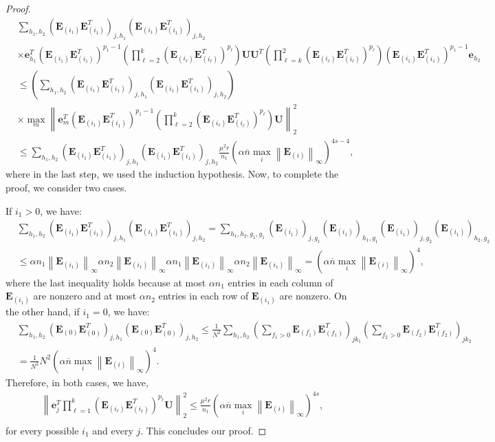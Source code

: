 \documentclass[twoside,11pt]{article}
\newcommand{\norm}[1]{\left\lVert#1\right\rVert}
\newcommand{\matE}{\mathbf{E}}
\newcommand{\matU}{\mathbf{U}}
\newcommand{\vece}{\mathbf{e}}
\newcommand{\bn}{{\overline{n}}}
\newcommand{\abnb}{\alpha \bn\max_{i}\norm{\matE_{(i)}}_{\infty}}
\newcommand{\murnone}{\frac{\mu^2 r}{n_1}}
\begin{document}
\begin{proof}
\begin{align*}
&\sum_{h_1,h_2}\left(\matE_{(i_1)}\matE_{(i_1)}^T\right)_{j,h_1}\left(\matE_{(i_1)}\matE_{(i_1)}^T\right)_{j,h_2}\\
&\times\vece_{h_1}^T(\matE_{(i_1)}\matE_{(i_1)}^T)^{p_1-1}\left(\prod_{\ell=2}^k(\matE_{(i_\ell)}\matE_{(i_\ell)}^T)^{p_\ell}\right)\matU\matU^T\left(\prod_{\ell=k}^2(\matE_{(i_\ell)}\matE_{(i_\ell)}^T)^{p_\ell}\right)(\matE_{(i_1)}\matE_{(i_1)}^T)^{p_1-1}\vece_{h_2}\\
&\le\left(\sum_{h_1,h_2}\left(\matE_{(i_1)}\matE_{(i_1)}^T\right)_{j,h_1}\left(\matE_{(i_1)}\matE_{(i_1)}^T\right)_{j,h_2}\right)\\
&\times\max_{m}\norm{\vece_{m}^T(\matE_{(i_1)}\matE_{(i_1)}^T)^{p_1-1}\left(\prod_{\ell=2}^k(\matE_{(i_\ell)}\matE_{(i_\ell)}^T)^{p_\ell}\right)\matU}_2^2\\
&\le \sum_{h_1,h_2}\left(\matE_{(i_1)}\matE_{(i_1)}^T\right)_{j,h_1}\left(\matE_{(i_1)}\matE_{(i_1)}^T\right)_{j,h_2} \murnone \left(\abnb\right)^{4s-4},
\end{align*}
where in the last step, we used the induction hypothesis. Now, to complete the proof, we consider two cases. 

If $i_1>0$, we have:
\begin{equation*}
\begin{aligned}
&\sum_{h_1,h_2}\left(\matE_{(i_1)}\matE_{(i_1)}^T\right)_{j,h_1}\left(\matE_{(i_1)}\matE_{(i_1)}^T\right)_{j,h_2}=\sum_{h_1,h_2,g_1,g_1}(\matE_{(i_1)})_{j,g_1}(\matE_{(i_1)})_{h_1,g_1}(\matE_{(i_1)})_{j,g_2}(\matE_{(i_1)})_{h_2,g_2}\\
&\le \alpha n_1\norm{\matE_{(i_1)}}_{\infty}\alpha n_2\norm{\matE_{(i_1)}}_{\infty}\alpha n_1\norm{\matE_{(i_1)}}_{\infty}\alpha n_2\norm{\matE_{(i_1)}}_{\infty}=\left(\abnb\right)^4,
\end{aligned}
\end{equation*}
where the last inequality holds because at most $\alpha n_1$ entries in each column of $\matE_{(i_1)}$ are nonzero and at most $\alpha n_2$ entries in each row of $\matE_{(i_1)}$ are nonzero.
On the other hand, if $i_1=0$, we have:
\begin{equation*}
\begin{aligned}
&\sum_{h_1,h_2}\left(\matE_{(0)}\matE_{(0)}^T\right)_{j,h_1}\left(\matE_{(0)}\matE_{(0)}^T\right)_{j,h_2}\le\frac{1}{N^2}\sum_{h_1,h_2}\left(\sum_{f_1>0}\matE_{(f_1)}\matE_{(f_1)}^T\right)_{jk_1}\left(\sum_{f_2>0}\matE_{(f_2)}\matE_{(f_2)}^T\right)_{jk_2}\\
&=\frac{1}{N^2}N^2 \left(\abnb\right)^4.
\end{aligned}
\end{equation*}
Therefore, in both cases, we have,
$$
\begin{aligned}
&\norm{\vece_j^T\prod_{\ell=1}^k(\matE_{(i_{\ell})}\matE_{(i_{\ell})}^T)^{p_{\ell}}\matU}_2^2\le \murnone \left(\abnb\right)^{4s},\\
\end{aligned}
$$
for every possible $i_1$ and every $j$. This concludes our proof. 
\end{proof}
\end{document}
